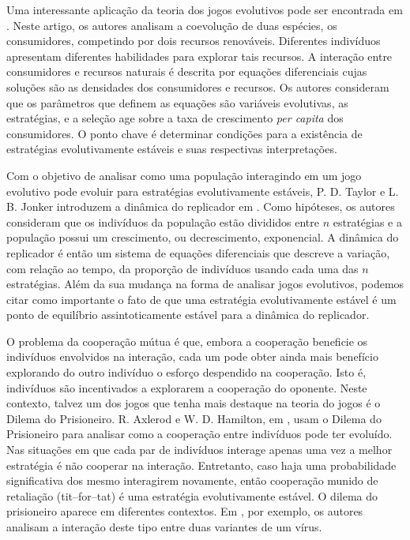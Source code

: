 \documentclass[
	12pt,				%
	openany,			%
	oneoside,			%
	a4paper,			%
	english,			%
	spanish,			%
	brazil,				%
	]{abntex2}
\begin{document}
Uma interessante aplicação da teoria dos jogos evolutivos pode ser encontrada em \cite{lawlor}. Neste artigo, os autores analisam a coevolução de duas espécies, os consumidores, competindo por dois recursos renováveis. Diferentes indivíduos apresentam diferentes habilidades para explorar tais recursos. A interação entre consumidores e recursos naturais é descrita por equações diferenciais cujas soluções são as densidades dos consumidores e recursos.  Os autores consideram que os parâmetros que definem as equações são variáveis evolutivas, as estratégias, e a seleção age sobre a taxa de crescimento \textit{per capita} dos consumidores.  O ponto chave é determinar condições para a existência de estratégias evolutivamente estáveis e suas respectivas interpretações. 

Com o objetivo de analisar como uma população interagindo em um jogo evolutivo pode evoluir para estratégias evolutivamente estáveis, P. D. Taylor e L. B. Jonker introduzem a dinâmica do replicador em \cite{Taylor1978145}. Como hipóteses, os autores consideram que os indivíduos da população estão divididos entre $n$ estratégias e a população possui um crescimento, ou decrescimento, exponencial. A dinâmica do replicador é então um sistema de equações diferenciais que descreve a variação, com relação ao tempo, da proporção de indivíduos usando cada uma das $n$  estratégias. Além da sua mudança na forma de analisar jogos evolutivos, podemos citar como importante o fato de que uma estratégia evolutivamente estável é um ponto de equilíbrio assintoticamente estável para a dinâmica do replicador.

O problema da cooperação mútua é que, embora a cooperação beneficie os indivíduos envolvidos na interação, cada um pode obter ainda mais benefício explorando do outro indivíduo o esforço despendido na cooperação. Isto é, indivíduos são incentivados a explorarem a cooperação do oponente. Neste contexto, talvez um dos jogos que tenha mais destaque na teoria do jogos é o Dilema do Prisioneiro.  R. Axlerod e W. D. Hamilton, em \cite{Axelrod81theevolution}, usam o Dilema do Prisioneiro para analisar como a cooperação entre indivíduos pode ter evoluído. Nas situações em que cada par de indivíduos interage apenas uma vez a melhor estratégia é não cooperar na interação. Entretanto, caso haja uma probabilidade significativa dos mesmo interagirem novamente, então cooperação munido de retaliação (tit--for--tat) é uma estratégia evolutivamente estável.      O dilema do prisioneiro aparece em diferentes contextos. Em \cite{PDV}, por exemplo, os autores analisam a interação deste tipo entre duas variantes de um vírus. 
\end{document}
